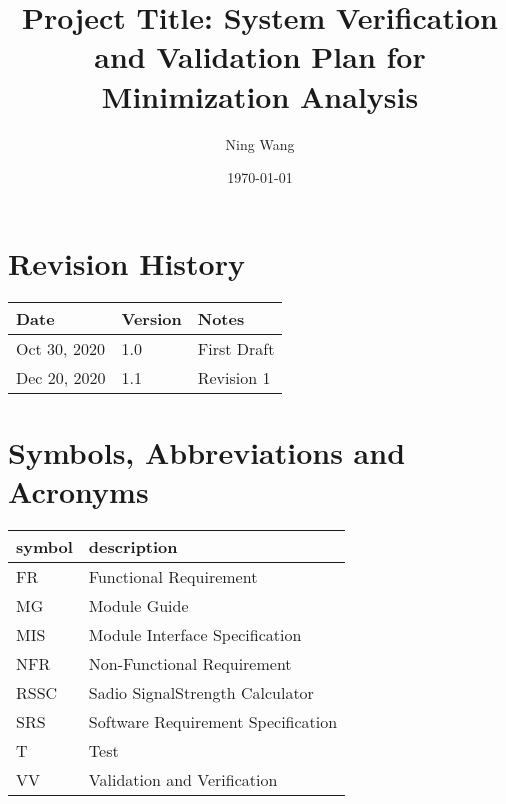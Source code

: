 \documentclass[12pt, titlepage]{article}
\begin{document}
\title{Project Title: System Verification and Validation Plan for Minimization Analysis} 
\author{Ning Wang}
\date{\today}
	
\maketitle


\section{Revision History}

\begin{tabularx}{\textwidth}{p{3cm}p{2cm}X}
\toprule {\bf Date} & {\bf Version} & {\bf Notes}\\
\midrule
Oct 30, 2020 & 1.0 & First Draft\\
Dec 20, 2020 & 1.1 & Revision 1\\
\bottomrule
\end{tabularx}

\newpage

\tableofcontents

\listoftables

\listoffigures

\newpage

\section{Symbols, Abbreviations and Acronyms}

\renewcommand{\arraystretch}{1.2}
\begin{tabular}{l l} 
  \toprule		
  \textbf{symbol} & \textbf{description}\\
  \midrule 
  FR & Functional Requirement\\
  MG & Module Guide\\
  MIS & Module Interface Specification\\
  NFR & Non-Functional Requirement\\
  RSSC & Sadio SignalStrength Calculator\\
  SRS & Software Requirement Specification\\
  T & Test\\
  VV & Validation and Verification\\
  \bottomrule
\end{tabular}\\
\end{document}
